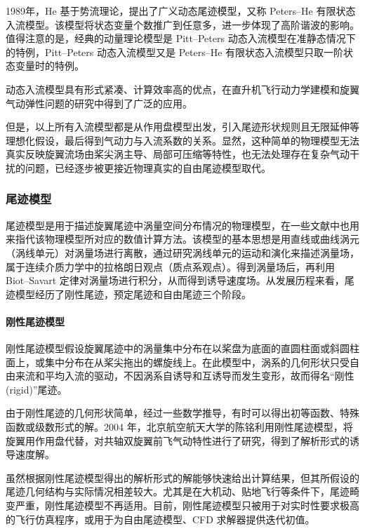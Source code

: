 1989年，He 基于势流理论，提出了广义动态尾迹模型，又称 Peters–He
有限状态入流模型。该模型将状态变量个数推广到任意多，进一步体现了高阶谐波的影响。值得注意的是，经典的动量理论模型是 Pitt–Peters
动态入流模型在准静态情况下的特例，Pitt–Peters 动态入流模型又是 Peters–He 有限状态入流模型只取一阶状态变量时的特例。

动态入流模型具有形式紧凑、计算效率高的优点，在直升机飞行动力学建模和旋翼气动弹性问题的研究中得到了广泛的应用。

但是，以上所有入流模型都是从作用盘模型出发，引入尾迹形状规则且无限延伸等理想化假设，最后得到气动力与入流系数的关系。显然，这种简单的物理模型无法真实反映旋翼流场由桨尖涡主导、局部可压缩等特性，也无法处理存在复杂气动干扰的问题，已经逐步被更接近物理真实的自由尾迹模型取代。

\subsubsection{尾迹模型}

尾迹模型是用于描述旋翼尾迹中涡量空间分布情况的物理模型，在一些文献中也用来指代该物理模型所对应的数值计算方法。该模型的基本思想是用直线或曲线涡元（涡线单元）对涡量场进行离散，通过研究涡线单元的运动和演化来描述涡量场，属于连续介质力学中的拉格朗日观点（质点系观点）。得到涡量场后，再利用
Biot–Savart 定律对涡量场进行积分，从而得到诱导速度场。从发展历程来看，尾迹模型经历了刚性尾迹，预定尾迹和自由尾迹三个阶段。

\paragraph{刚性尾迹模型}

刚性尾迹模型假设旋翼尾迹中的涡量集中分布在以桨盘为底面的直圆柱面或斜圆柱面上，或集中分布在从桨尖拖出的螺旋线上。在此模型中，涡系的几何形状只受自由来流和平均入流的驱动，不因涡系自诱导和互诱导而发生变形，故而得名“刚性
(rigid)”尾迹。

由于刚性尾迹的几何形状简单，经过一些数学推导，有时可以得出初等函数、特殊函数或级数形式的解。2004 年，北京航空航天大学的陈铭利用刚性尾迹模型，将旋翼用作用盘代替，对共轴双旋翼前飞气动特性进行了研究，得到了解析形式的诱导速度解。

虽然根据刚性尾迹模型得出的解析形式的解能够快速给出计算结果，但其所假设的尾迹几何结构与实际情况相差较大。尤其是在大机动、贴地飞行等条件下，尾迹畸变严重，刚性尾迹模型不再适用。目前，刚性尾迹模型只被用于对实时性要求极高的飞行仿真程序，或用于为自由尾迹模型、CFD
求解器提供迭代初值。

